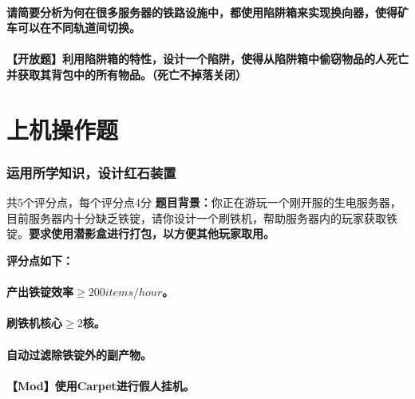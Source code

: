 \documentclass{exampaper}
\begin{document}
            \subsection{请简要分析为何在很多服务器的铁路设施中，都使用陷阱箱来实现换向器，使得矿车可以在不同轨道间切换。}
                \vspace{2.5cm}
            
            \subsection{\textbf{【开放题】}利用陷阱箱的特性，设计一个陷阱，使得从陷阱箱中偷窃物品的人死亡并获取其背包中的所有物品。（死亡不掉落关闭）}
                \vspace{2.5cm}

    \clearpage

    \part{上机操作题} %
        \section{运用所学知识，设计红石装置}{共5个评分点，每个评分点4分} %
            \textbf{题目背景：}你正在游玩一个刚开服的生电服务器，目前服务器内十分缺乏铁锭，请你设计一个刷铁机，帮助服务器内的玩家获取铁锭。\textbf{要求使用潜影盒进行打包，以方便其他玩家取用。}
            
            \textbf{评分点如下：}

            \subsection{产出铁锭效率$\geq 200 items/hour$。}
            
            \subsection{刷铁机核心$\geq 2$核。}

            \subsection{自动过滤除铁锭外的副产物。}

            \subsection{\textbf{【Mod】}使用Carpet进行假人挂机。}
\end{document}
